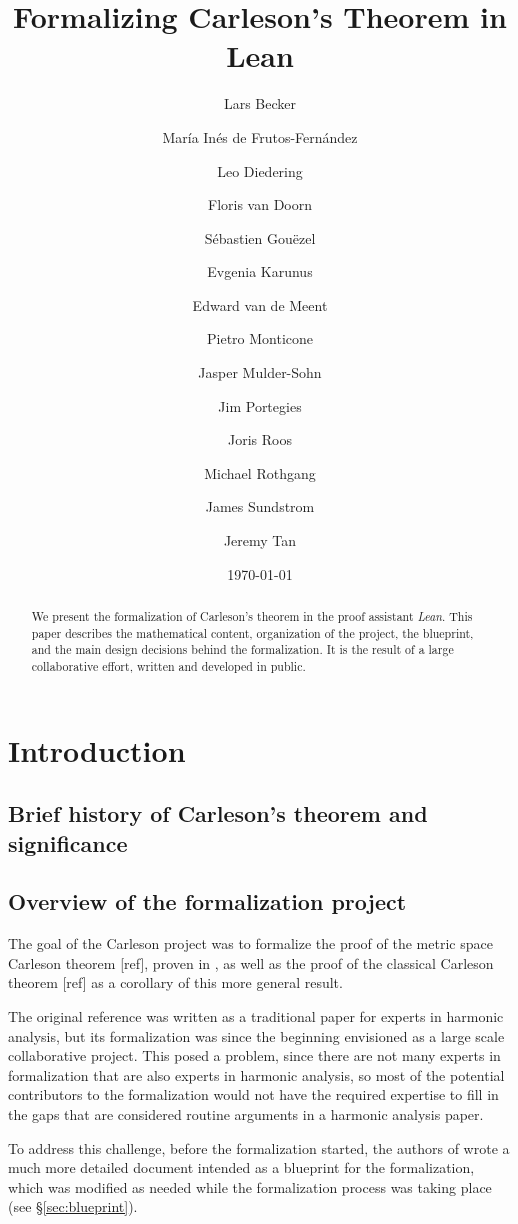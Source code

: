 \documentclass[12pt]{amsart}
\title{\textbf{Formalizing Carleson's Theorem in Lean}}
\author[Becker et al.]{Lars Becker}
\author[]{Mar\'ia Inés de Frutos-Fernández}
\author[]{Leo Diedering}
\author[]{Floris van Doorn}
\author[]{Sébastien Gouëzel}
\author[]{Evgenia Karunus}
\author[]{Edward van de Meent}
\author[]{Pietro Monticone}
\author[]{Jasper Mulder-Sohn}
\author[]{Jim Portegies}
\author[]{Joris Roos}
\author[]{Michael Rothgang}
\author[]{James Sundstrom}
\author[]{Jeremy Tan}
\date{\today}
\begin{document}
\maketitle

\begin{abstract}
We present the formalization of Carleson's theorem in the proof assistant \emph{Lean}.
This paper describes the mathematical content, organization of the project, the blueprint,
and the main design decisions behind the formalization. It is the result of a large
collaborative effort, written and developed in public.
\end{abstract}

\tableofcontents

\section{Introduction}\label{sec:intro}

\subsection{Brief history of Carleson's theorem and significance}\label{subsec:history}

\subsection{Overview of the formalization project}\label{subsec:overview}
The goal of the Carleson project was to formalize the proof of the metric space Carleson theorem [ref], proven in \cite{ThieleCarlesonPreprint}, as well as the proof of the classical Carleson theorem [ref] as a corollary of this more general result.

The original reference \cite{ThieleCarlesonPreprint} was written as a traditional paper for experts in harmonic analysis, but its formalization was since the beginning envisioned as a large scale collaborative project. This posed a problem, since there are not many experts in formalization that are also experts in harmonic analysis, so most of the potential contributors to the formalization would not have the required expertise to fill in the gaps that are considered routine arguments in a harmonic analysis paper.

To address this challenge, before the formalization started, the authors of \cite{ThieleCarlesonPreprint} wrote a much more detailed document \cite{CarlesonBlueprint} intended as a blueprint for the formalization, which was modified as needed while the formalization process was taking place (see \S\ref{sec:blueprint}).
\end{document}
